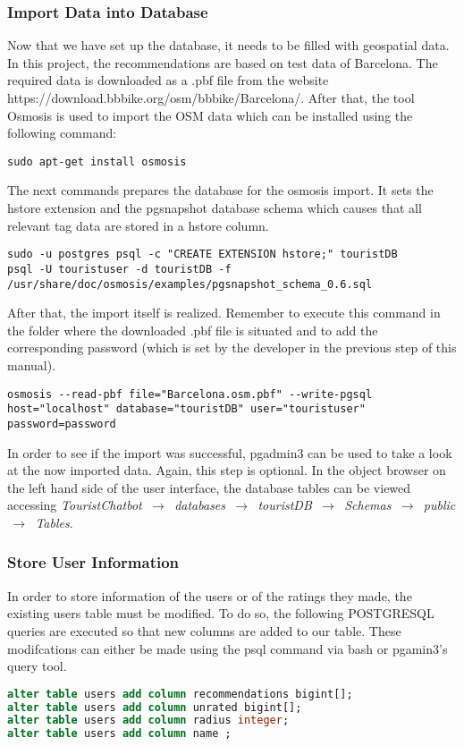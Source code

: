 \subsubsection{Import Data into Database}
Now that we have set up the database, it needs to be filled with geospatial data. In this project, the recommendations are based on test data of Barcelona. The required data is downloaded as a .pbf file from the website https://download.bbbike.org/osm/bbbike/Barcelona/. After that, the tool Osmosis is used to import the OSM data which can be installed using the following command:
\begin{lstlisting}
sudo apt-get install osmosis
\end{lstlisting}
The next commands prepares the database for the osmosis import. It sets the hstore extension and the pgsnapshot database schema which causes that all relevant tag data are stored in a hstore column.
\begin{lstlisting}
sudo -u postgres psql -c "CREATE EXTENSION hstore;" touristDB
psql -U touristuser -d touristDB -f /usr/share/doc/osmosis/examples/pgsnapshot_schema_0.6.sql
\end{lstlisting}
After that, the import itself is realized. Remember to execute this command in the folder where the downloaded .pbf file is situated and to add the corresponding password (which is set by the developer in the previous step of this manual).
\begin{lstlisting}
osmosis --read-pbf file="Barcelona.osm.pbf" --write-pgsql host="localhost" database="touristDB" user="touristuser" password=password
\end{lstlisting}
In order to see if the import was successful, pgadmin3 can be used to take a look at the now imported data. Again, this step is optional. In the object browser on the left hand side of the user interface, the database tables can be viewed accessing \textit{TouristChatbot $\,\to\,$ databases $\,\to\,$ touristDB $\,\to\,$ Schemas $\,\to\,$ public $\,\to\,$ Tables}.

\subsubsection{Store User Information}
In order to store information of the users or of the ratings they made, the existing users table must be modified. To do so, the following POSTGRESQL queries are executed so that new columns are added to our table. These modifcations can either be made using the psql command via bash or pgamin3's query tool.
\begin{lstlisting}[language=sql]
alter table users add column recommendations bigint[];
alter table users add column unrated bigint[];
alter table users add column radius integer;
alter table users add column name ;
\end{lstlisting}

